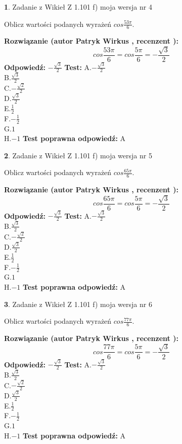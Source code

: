 \documentclass[12pt, a4paper]{article}
\theoremstyle{definition} %
\newtheorem{zad}{}
\newcommand{\zadStart}[1]{\begin{zad}#1\newline}
\newcommand{\zadStop}{\end{zad}}
\newcommand{\rozwStart}[2]{\noindent \textbf{Rozwiązanie (autor #1 , recenzent #2): }\newline}
\newcommand{\rozwStop}{\newline}
\newcommand{\odpStart}{\noindent \textbf{Odpowiedź:}\newline}
\newcommand{\odpStop}{\newline}
\newcommand{\testStart}{\noindent \textbf{Test:}\newline}
\newcommand{\testStop}{\newline}
\newcommand{\kluczStart}{\noindent \textbf{Test poprawna odpowiedź:}\newline}
\newcommand{\kluczStop}{\newline}
\begin{document}
\zadStart{Zadanie z Wikieł Z 1.101 f) moja wersja nr 4}

Oblicz wartości podanych wyrażeń $cos \frac{53\pi}{6}$.
\zadStop
\rozwStart{Patryk Wirkus}{}
$$cos \frac{53\pi}{6} = cos \frac{5\pi}{6} = -\frac{\sqrt{3}}{2}$$
\rozwStop
\odpStart
$-\frac{\sqrt{3}}{2}$
\odpStop
\testStart
A.$-\frac{\sqrt{3}}{2}$\\
B.$\frac{\sqrt{3}}{2}$\\
C.$-\frac{\sqrt{2}}{2}$\\
D.$\frac{\sqrt{3}}{2}$\\
E.$\frac{1}{2}$\\
F.$-\frac{1}{2}$\\
G.$1$\\
H.$-1$
\testStop
\kluczStart
A
\kluczStop



\zadStart{Zadanie z Wikieł Z 1.101 f) moja wersja nr 5}

Oblicz wartości podanych wyrażeń $cos \frac{65\pi}{6}$.
\zadStop
\rozwStart{Patryk Wirkus}{}
$$cos \frac{65\pi}{6} = cos \frac{5\pi}{6} = -\frac{\sqrt{3}}{2}$$
\rozwStop
\odpStart
$-\frac{\sqrt{3}}{2}$
\odpStop
\testStart
A.$-\frac{\sqrt{3}}{2}$\\
B.$\frac{\sqrt{3}}{2}$\\
C.$-\frac{\sqrt{2}}{2}$\\
D.$\frac{\sqrt{3}}{2}$\\
E.$\frac{1}{2}$\\
F.$-\frac{1}{2}$\\
G.$1$\\
H.$-1$
\testStop
\kluczStart
A
\kluczStop



\zadStart{Zadanie z Wikieł Z 1.101 f) moja wersja nr 6}

Oblicz wartości podanych wyrażeń $cos \frac{77\pi}{6}$.
\zadStop
\rozwStart{Patryk Wirkus}{}
$$cos \frac{77\pi}{6} = cos \frac{5\pi}{6} = -\frac{\sqrt{3}}{2}$$
\rozwStop
\odpStart
$-\frac{\sqrt{3}}{2}$
\odpStop
\testStart
A.$-\frac{\sqrt{3}}{2}$\\
B.$\frac{\sqrt{3}}{2}$\\
C.$-\frac{\sqrt{2}}{2}$\\
D.$\frac{\sqrt{3}}{2}$\\
E.$\frac{1}{2}$\\
F.$-\frac{1}{2}$\\
G.$1$\\
H.$-1$
\testStop
\kluczStart
A
\kluczStop
\end{document}
